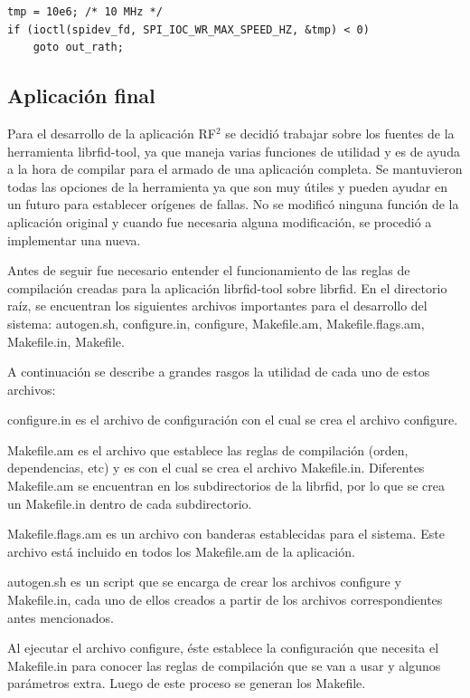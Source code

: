 \begin{verbatim}
tmp = 10e6; /* 10 MHz */
if (ioctl(spidev_fd, SPI_IOC_WR_MAX_SPEED_HZ, &tmp) < 0)
    goto out_rath;
\end{verbatim}

\subsection{Aplicación final}

Para el desarrollo de la aplicación RF$^{2}$ se decidió trabajar sobre los fuentes de la herramienta librfid-tool, ya que maneja varias funciones de utilidad y es de ayuda a la hora de compilar para el armado de una aplicación completa. Se mantuvieron todas las opciones de la herramienta ya que son muy útiles y pueden ayudar en un futuro para establecer orígenes de fallas. No se modificó ninguna función de la aplicación original y cuando fue necesaria alguna modificación, se procedió a implementar una nueva.

\bigskip
Antes de seguir fue necesario entender el funcionamiento de las reglas de compilación creadas para la aplicación librfid-tool sobre librfid. En el directorio raíz, se encuentran los siguientes archivos importantes para el desarrollo del sistema: autogen.sh, configure.in, configure, Makefile.am, Makefile.flags.am, Makefile.in, Makefile.

\bigskip
A continuación se describe a grandes rasgos la utilidad de cada uno de estos archivos:

\bigskip
configure.in es el archivo de configuración con el cual se crea el archivo configure.


Makefile.am es el archivo que establece las reglas de compilación (orden, dependencias, etc) y es con el cual se crea el archivo Makefile.in. Diferentes Makefile.am se encuentran en los subdirectorios de la librfid, por lo que se crea un Makefile.in dentro de cada subdirectorio.


Makefile.flags.am es un archivo con banderas establecidas para el sistema. Este archivo está incluido en todos los Makefile.am de la aplicación.


autogen.sh es un script que se encarga de crear los archivos configure y Makefile.in, cada uno de ellos creados a partir de los archivos correspondientes antes mencionados.

Al ejecutar el archivo configure, éste establece la configuración que necesita el Makefile.in para conocer las reglas de compilación que se van a usar y algunos parámetros extra. Luego de este proceso se generan los Makefile.

